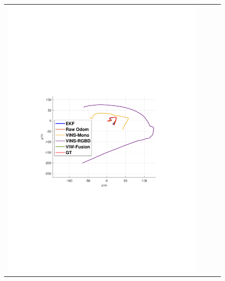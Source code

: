 \documentclass[conference]{IEEEtran}
\begin{document}
\begin{figure}
\begin{center}
\begin{tabular}{cccc}
				\includegraphics[scale=0.26]{fig/hall1.pdf} &

\end{tabular}
\end{center}
\end{figure}
\end{document}
